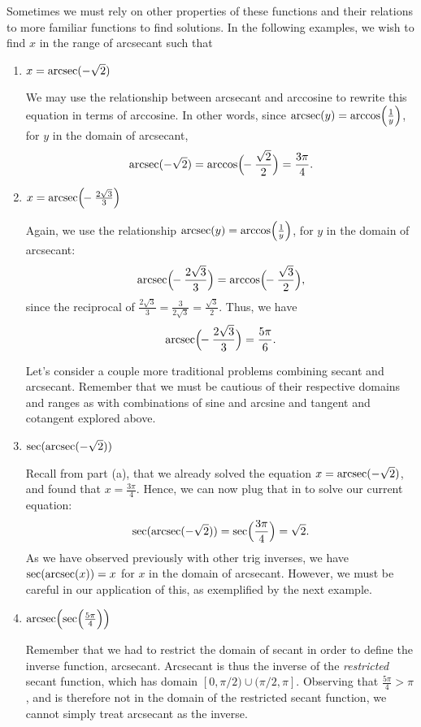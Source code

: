 \documentclass{ximera}
\begin{document}
\begin{example}
Sometimes we must rely on other properties of these functions and their relations to more familiar functions to find solutions. In the following examples, we wish to find $x$ in the range of arcsecant such that
\begin{enumerate}
\item $x = \operatorname{arcsec}(-\sqrt{2})$ \\
\begin{explanation}
We may use the relationship between arcsecant and arccosine to rewrite this equation in terms of arccosine. In other words, since $\operatorname{arcsec}(y) = \arccos\!\Big(\frac{1}{y}\Big)$, for $y$ in the domain of arcsecant,
$$\operatorname{arcsec}(-\sqrt{2}) = \arccos\!\Big(\!\!-\frac{\sqrt{2}}{2}\Big) = \frac{3\pi}{4}.$$
\end{explanation}

\item $x=\operatorname{arcsec} \!\Big(\!\! - \frac{2\sqrt{3}}{3}\Big)$\\
\begin{explanation}
Again, we use the relationship $\operatorname{arcsec}(y) = \arccos\!\Big(\frac{1}{y}\Big)$, for $y$ in the domain of arcsecant:
%
$$\operatorname{arcsec} \!\Big(\!\! - \frac{2\sqrt{3}}{3}\Big) = \arccos\!\Big(\!\! - \frac{\sqrt{3}}{2}\Big),$$
%
since the reciprocal of $\frac{2\sqrt{3}}{3} = \frac{3}{2\sqrt{3}} = \frac{\sqrt{3}}{2}$. Thus, we have 
%
$$\operatorname{arcsec} \!\Big(\!\! - \frac{2\sqrt{3}}{3}\Big)=\frac{5\pi}{6}.$$
\end{explanation}

Let's consider a couple more traditional problems combining secant and arcsecant. Remember that we must be cautious of their respective domains and ranges as with combinations of sine and arcsine and tangent and cotangent explored above.
\item $\sec(\operatorname{arcsec}(-\sqrt{2}))$\\
\begin{explanation}
Recall from part (a), that we already solved the equation $x = \operatorname{arcsec}(-\sqrt{2})$, and found that $x = \frac{3\pi}{4}$. Hence, we can now plug that in to solve our current equation:
%
$$\sec(\operatorname{arcsec}(-\sqrt{2})) = \sec\!\Big(\frac{3\pi}{4}\Big) = \sqrt{2}.$$
%
As we have observed previously with other trig inverses, we have $\sec(\operatorname{arcsec}(x)) = x$ for $x$ in the domain of arcsecant. However, we must be careful in our application of this, as exemplified by the next example.
\end{explanation}

\item $\operatorname{arcsec}\!\Big(\!\sec\!\Big(\frac{5\pi}{4}\Big)\Big)$\\
\begin{explanation}
Remember that we had to restrict the domain of secant in order to define the inverse function, arcsecant. Arcsecant is thus the inverse of the {\it restricted} secant function, which has domain $[0, \pi/2)\cup (\pi/2,\pi]$. Observing that $\frac{5\pi}{4} >\pi$, and is therefore not in the domain of the restricted secant function, we cannot simply treat arcsecant as the inverse.


\end{explanation}
\end{enumerate}
\end{example}
\end{document}
